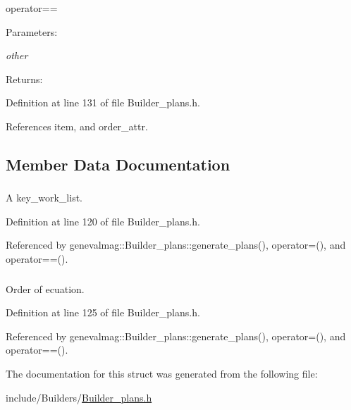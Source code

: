 operator== \begin{Desc}
\item[Parameters:]
\begin{description}
\item[{\em other}]\end{description}
\end{Desc}
\begin{Desc}
\item[Returns:]\end{Desc}


Definition at line 131 of file Builder\_\-plans.h.

References item, and order\_\-attr.

\subsection{Member Data Documentation}
\hypertarget{structgenevalmag_1_1i__w_cb047851d2d48bfa097543a5a891e995}{
\subsubsection[{item}]{}}
\label{structgenevalmag_1_1i__w_cb047851d2d48bfa097543a5a891e995}


A key\_\-work\_\-list. 



Definition at line 120 of file Builder\_\-plans.h.

Referenced by genevalmag::Builder\_\-plans::generate\_\-plans(), operator=(), and operator==().\hypertarget{structgenevalmag_1_1i__w_a3b6c0dee2aa7ce5808ff3d7068e20e9}{
\subsubsection[{order\_\-attr}]{}}
\label{structgenevalmag_1_1i__w_a3b6c0dee2aa7ce5808ff3d7068e20e9}


Order of ecuation. 



Definition at line 125 of file Builder\_\-plans.h.

Referenced by genevalmag::Builder\_\-plans::generate\_\-plans(), operator=(), and operator==().

The documentation for this struct was generated from the following file:\begin{CompactItemize}
\item 
include/Builders/\hyperlink{Builder__plans_8h}{Builder\_\-plans.h}\end{CompactItemize}
